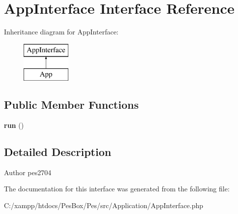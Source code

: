 \hypertarget{interface_application_1_1_app_interface}{}\section{App\+Interface Interface Reference}
\label{interface_application_1_1_app_interface}
Inheritance diagram for App\+Interface\+:\begin{figure}[H]
\begin{center}
\leavevmode
\includegraphics[height=2.000000cm]{interface_application_1_1_app_interface}
\end{center}
\end{figure}
\subsection*{Public Member Functions}
\begin{DoxyCompactItemize}
\item 
\mbox{\label{interface_application_1_1_app_interface_afb0fafe7e02a3ae1993c01c19fad2bae}} 
{\bfseries run} ()
\end{DoxyCompactItemize}


\subsection{Detailed Description}
\begin{DoxyAuthor}{Author}
pes2704 
\end{DoxyAuthor}


The documentation for this interface was generated from the following file\+:\begin{DoxyCompactItemize}
\item 
C\+:/xampp/htdocs/\+Pes\+Box/\+Pes/src/\+Application/App\+Interface.\+php\end{DoxyCompactItemize}
